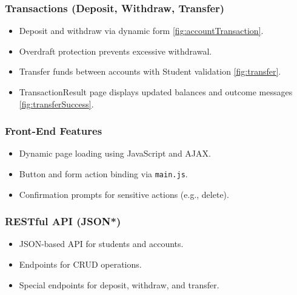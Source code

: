 \documentclass[12pt]{article}
\begin{document}
\subsubsection{Transactions (Deposit, Withdraw, Transfer)}

\begin{itemize}
	\item Deposit and withdraw via dynamic form \autoref{fig:accountTransaction}.
	\item Overdraft protection prevents excessive withdrawal.
	\item Transfer funds between accounts with Student validation \autoref{fig:transfer}.
	\item TransactionResult page displays updated balances and outcome messages \autoref{fig:transferSuccess}.
\end{itemize}

\begin{center}
\end{center}

\subsubsection{Front-End Features}

\begin{itemize}
	\item Dynamic page loading using JavaScript and AJAX.
	\item Button and form action binding via \texttt{main.js}.
	\item Confirmation prompts for sensitive actions (e.g., delete).
\end{itemize}

\begin{center}
\end{center}

\subsubsection{RESTful API (JSON*)}

\begin{itemize}
	\item JSON-based API for students and accounts.
	\item Endpoints for CRUD operations.
	\item Special endpoints for deposit, withdraw, and transfer.
\end{itemize}
\end{document}
